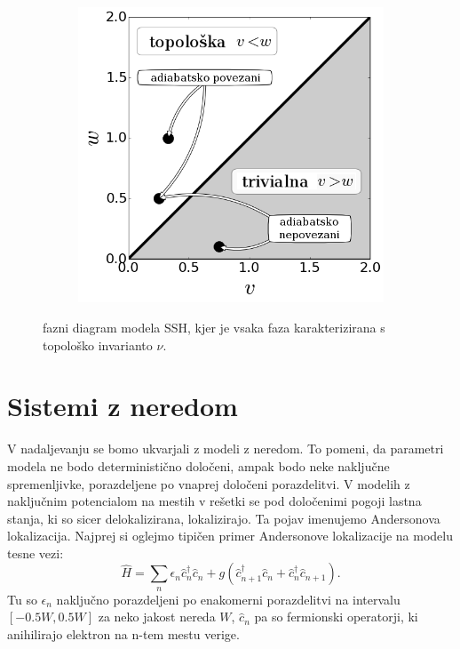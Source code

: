 \begin{figure}[!h]
\centering
\begin{subfigure}{.5\textwidth}
\includegraphics[width=\linewidth]{Figures/PhaseDiag.png}
\end{subfigure}
\caption{fazni diagram modela SSH, kjer je vsaka faza karakterizirana s topološko invarianto $\nu$.}
\label{fig:phasediag}
\end{figure}

\chapter{Sistemi z neredom}
V nadaljevanju se bomo ukvarjali z modeli z neredom. To pomeni, da parametri modela ne bodo deterministično določeni, ampak bodo neke naključne spremenljivke, porazdeljene po vnaprej določeni porazdelitvi.
V modelih z naključnim potencialom na mestih v rešetki se pod določenimi pogoji lastna stanja, ki so sicer delokalizirana, lokalizirajo. Ta pojav imenujemo Andersonova lokalizacija.
Najprej si oglejmo tipičen primer Andersonove lokalizacije na modelu tesne vezi:
\begin{equation} \label{spomnimo2}
\hat{H} = \sum_n \epsilon_n \hat{c}_n^\dagger \hat{c}_n + g\left( \hat{c}_{n+1}^\dagger \hat{c}_n + \hat{c}_n^\dagger \hat{c}_{n+1} \right).
\end{equation}
Tu so $\epsilon_n$ naključno porazdeljeni po enakomerni porazdelitvi na intervalu $[-0.5W,0.5W]$ za neko jakost nereda $W$, $\hat{c}_n$ pa so fermionski operatorji, ki anihilirajo elektron na n-tem mestu verige.

